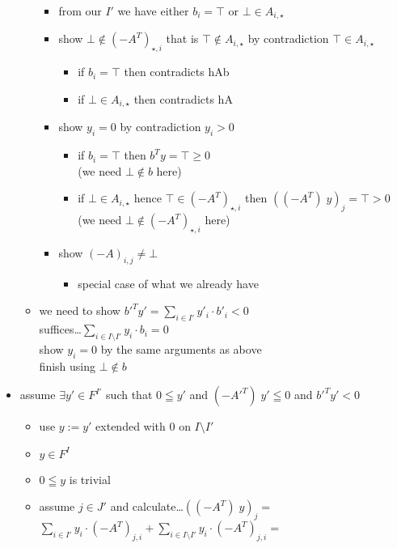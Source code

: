 \documentclass[]{article}
\begin{document}
\begin{itemize}
\begin{itemize}
	\begin{itemize}
		\item from our $I'$ we have either $ b_i = \top $ or $ \bot \in A_{i, \star} $
		\item show $ \bot \notin (-A^T)_{\star, i} $ that is $ \top \notin A_{i, \star} $ by contradiction $ \top \in A_{i, \star} $
		\begin{itemize}
			\item if $ b_i = \top $ then contradicts hAb
			\item if $ \bot \in A_{i, \star} $ then contradicts hA
		\end{itemize}
		\item show $y_i = 0$ by contradiction $y_i > 0$
		\begin{itemize}
			\item if $ b_i = \top $ then $b^T y = \top \ge 0$ \\
			(we need $\bot \notin b$ here)
			\item if $ \bot \in A_{i, \star} $ hence $ \top \in (-A^T)_{\star, i} $ then $ ((-A^T)\; y)_j = \top > 0$
			(we need $ \bot \notin (-A^T)_{\star, i} $ here)
		\end{itemize}
		\item show $ (-A)_{i,j} \neq \bot $
		\begin{itemize}
			\item special case of what we already have
		\end{itemize}
	\end{itemize}
	\item we need to show $b'^T y' = \sum\limits_{i \in I'} y'_i \cdot b'_i < 0$ \\
	suffices\dots $ \sum\limits_{i \in I \setminus I'} y_i \cdot b_i = 0 $ \\
	show $y_i = 0$ by the same arguments as above \\
	finish using $\bot \notin b$
\end{itemize}
\item assume $\exists y' \in F^{I'}$ such that $0 \leqq y'$ and $(-A'^T)\; y' \leqq 0$ and $b'^T y' < 0$
\begin{itemize}
	\item use $y := y'$ extended with $0$ on $I \setminus I'$
	\item $ y \in F^I $
	\item $0 \leqq y$ is trivial
	\item assume $j \in J'$ and calculate\dots $ ((-A^T)\; y)_j = $\\
	$ \sum\limits_{i \in I'} y_i \cdot (-A^T)_{j,i} + \sum\limits_{i \in I \setminus I'} y_i \cdot (-A^T)_{j,i} = $\\

\end{itemize}
\end{itemize}
\end{document}
